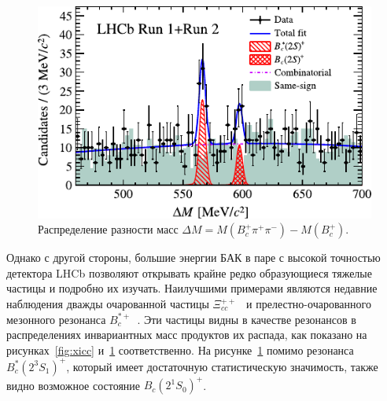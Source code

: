 \documentclass[a4paper, 10pt, twocolumn]{article}
\begin{document}
\begin{figure}[p!]%
	\centering
	\includegraphics[width=\linewidth]{figures/Bcstar}
	\caption{Распределение разности масс $\Delta M = M(B_c^+\pi^+\pi^-) - M(B_c^+)$.}
	\label{fig:Bcstar}
\end{figure}%

Однако с другой стороны, большие энергии БАК в паре с высокой точностью 
детектора LHCb позволяют открывать крайне редко образующиеся тяжелые 
частицы и подробно их изучать. Наилучшими примерами являются недавние 
наблюдения дважды очарованной частицы $\Xi_{cc}^{++}$~\cite{Xicc++} 
и прелестно-очарованного мезонного резонанса $B_c^{*+}$~\cite{Bcstar}. 
Эти частицы видны в качестве резонансов в распределениях инвариантных 
масс продуктов их распада, как показано на рисунках~\ref{fig:xicc} 
и~\ref{fig:Bcstar} соответственно. На рисунке~\ref{fig:Bcstar} помимо 
резонанса $B_c^*(2^3S_1)^+$, который имеет достаточную статистическую 
значимость, также видно возможное состояние $B_c(2^1S_0)^+$.

\end{document}
